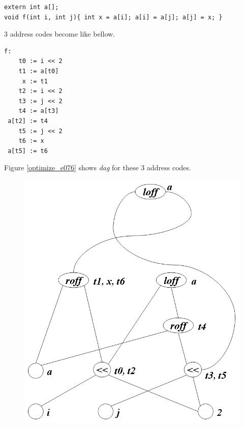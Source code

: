 \begin{Example}
\begin{verbatim}
extern int a[];
void f(int i, int j){ int x = a[i]; a[i] = a[j]; a[j] =	x; }
\end{verbatim}
3 address codes become like bellow.
\begin{verbatim}
f:
    t0 := i << 2
    t1 := a[t0]
     x := t1
    t2 := i << 2
    t3 := j << 2
    t4 := a[t3]
 a[t2] := t4
    t5 := j << 2
    t6 := x
 a[t5] := t6
\end{verbatim}
Figure \ref{optimize_e076} shows {\em dag} for these 3 address codes.
\begin{figure}[htbp]
\begin{center}
\begin{htmlonly}
\includegraphics[width=1.0\linewidth,height=1.069\linewidth]{opt031.png}
\end{htmlonly}
\begin{latexonly}

\end{latexonly}
\end{center}
\end{figure}
\end{Example}
